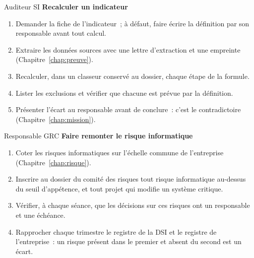 \begin{boxmetier}{Auditeur SI}
\textbf{Recalculer un indicateur}
\begin{enumerate}
    \item Demander la fiche de l'indicateur~; à défaut, faire écrire la
          définition par son responsable avant tout calcul.
    \item Extraire les données sources avec une lettre d'extraction et une
          empreinte (Chapitre~\ref{chap:preuve}).
    \item Recalculer, dans un classeur conservé au dossier, chaque étape de
          la formule.
    \item Lister les exclusions et vérifier que chacune est prévue par la
          définition.
    \item Présenter l'écart au responsable avant de conclure~: c'est le
          contradictoire (Chapitre~\ref{chap:mission}).
\end{enumerate}
\end{boxmetier}

\begin{boxmetier}{Responsable GRC}
\textbf{Faire remonter le risque informatique}
\begin{enumerate}
    \item Coter les risques informatiques sur l'échelle commune de
          l'entreprise (Chapitre~\ref{chap:risque}).
    \item Inscrire au dossier du comité des risques tout risque informatique
          au-dessus du seuil d'appétence, et tout projet qui modifie un
          système critique.
    \item Vérifier, à chaque séance, que les décisions sur ces risques ont
          un responsable et une échéance.
    \item Rapprocher chaque trimestre le registre de la DSI et le registre
          de l'entreprise~: un risque présent dans le premier et absent du
          second est un écart.
\end{enumerate}
\end{boxmetier}


\separateur

